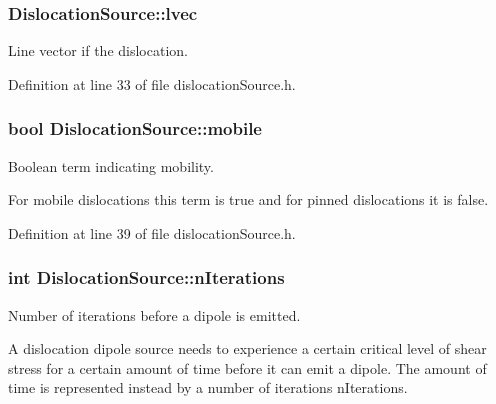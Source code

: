 \hypertarget{classDislocationSource_a6a1ab6dc549236d2335a200e601781ea}{
\subsubsection[{lvec}]{ Dislocation\-Source\-::lvec\hspace{0.3cm}{\ttfamily [protected]}}}\label{de/de3/classDislocationSource_a6a1ab6dc549236d2335a200e601781ea}


Line vector if the dislocation. 



Definition at line 33 of file dislocation\-Source.\-h.

\hypertarget{classDislocationSource_a7cfb4fd64ac4da8c79398b6e2c732875}{
\subsubsection[{mobile}]{\setlength{\rightskip}{0pt plus 5cm}bool Dislocation\-Source\-::mobile\hspace{0.3cm}{\ttfamily [protected]}}}\label{de/de3/classDislocationSource_a7cfb4fd64ac4da8c79398b6e2c732875}


Boolean term indicating mobility. 

For mobile dislocations this term is true and for pinned dislocations it is false. 

Definition at line 39 of file dislocation\-Source.\-h.

\hypertarget{classDislocationSource_aacf42c7505f28b50280b23b435024e17}{
\subsubsection[{n\-Iterations}]{\setlength{\rightskip}{0pt plus 5cm}int Dislocation\-Source\-::n\-Iterations\hspace{0.3cm}{\ttfamily [protected]}}}\label{de/de3/classDislocationSource_aacf42c7505f28b50280b23b435024e17}


Number of iterations before a dipole is emitted. 

A dislocation dipole source needs to experience a certain critical level of shear stress for a certain amount of time before it can emit a dipole. The amount of time is represented instead by a number of iterations n\-Iterations. 

